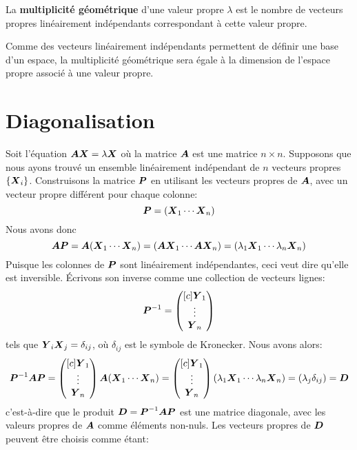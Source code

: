 \begin{defini}
La \textbf{multiplicité géométrique} d'une valeur propre $\lambda$ est le nombre de
vecteurs propres linéairement indépendants correspondant à cette valeur propre. 
\end{defini}

Comme des vecteurs linéairement indépendants permettent de définir une base d'un espace, la
multiplicité géométrique sera égale à la dimension de l'espace propre associé à une valeur propre.

\section{Diagonalisation}
Soit l'équation $\boldsymbol{A}\boldsymbol{X} = \lambda\boldsymbol{X}$ où la matrice $\boldsymbol{A}$ est une matrice $n\times n$.  
Supposons que nous ayons trouvé un ensemble linéairement indépendant de $n$ vecteurs propres $\{\boldsymbol{X}_i\}$.
Construisons la matrice $\boldsymbol{P}$ en utilisant les vecteurs propres de $\boldsymbol{A}$, avec un vecteur propre différent pour chaque colonne:
\[
\boldsymbol{P} = (\boldsymbol{X}_1 \cdots \boldsymbol{X}_n)
\]
Nous avons donc
\[
 \boldsymbol{A} \boldsymbol{P} = \boldsymbol{A} (\boldsymbol{X}_1 \cdots \boldsymbol{X}_n) = ( \boldsymbol{A}\boldsymbol{X}_1 \cdots  \boldsymbol{A}\boldsymbol{X}_n) =  ( \lambda_1\boldsymbol{X}_1 \cdots  \lambda_n\boldsymbol{X}_n)
\]
Puisque les colonnes de $\boldsymbol{P}$ sont linéairement indépendantes, ceci veut dire qu'elle est inversible. 
Écrivons son inverse comme une collection de vecteurs lignes:
\[
\boldsymbol{P}^{-1} = \begin{pmatrix}[c]
\boldsymbol{Y}_1 \\ \vdots \\ \boldsymbol{Y}_n
\end{pmatrix}
\]
tels que $\boldsymbol{Y}_i \boldsymbol{X}_j = \delta_{ij}$, où $ \delta_{ij}$ est le symbole de Kronecker. 
Nous avons alors:
\[
\boldsymbol{P}^{-1} \boldsymbol{A} \boldsymbol{P} = \begin{pmatrix}[c]
\boldsymbol{Y}_1 \\ \vdots \\ \boldsymbol{Y}_n
\end{pmatrix} \boldsymbol{A} (\boldsymbol{X}_1 \cdots \boldsymbol{X}_n) 
=   \begin{pmatrix}[c]
\boldsymbol{Y}_1 \\ \vdots \\ \boldsymbol{Y}_n
\end{pmatrix} ( \lambda_1\boldsymbol{X}_1 \cdots  \lambda_n\boldsymbol{X}_n) = (\lambda_j \delta_{ij}) = \boldsymbol{D}
\]
c'est-à-dire que le produit $\boldsymbol{D} = \boldsymbol{P}^{-1} \boldsymbol{A} \boldsymbol{P}$ est une matrice diagonale, 
avec les valeurs propres de $\boldsymbol{A}$ comme éléments non-nuls.  Les vecteurs propres de $\boldsymbol{D}$ peuvent
être choisis comme étant:
